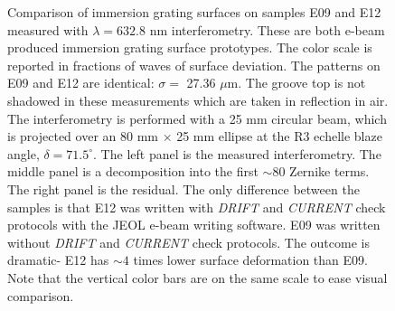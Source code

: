 \begin{figure}
   \newline
  \caption[Interferometry reveals dramatic improvement in performance of e-beam produced immersion gratings]{Comparison of immersion grating surfaces on samples E09 and E12 measured with $\lambda = 632.8 $ nm interferometry.  These are both e-beam produced immersion grating surface prototypes.  The color scale is reported in fractions of waves of surface deviation.  The patterns on E09 and E12 are identical: $\sigma = $ 27.36 $\mu$m.  The groove top is not shadowed in these measurements which are taken in reflection in air.  The interferometry is performed with a 25 mm circular beam, which is projected over an 80 mm $\times$ 25 mm ellipse at the R3 echelle blaze angle, $\delta = 71.5 ^\circ$.  The left panel is the measured interferometry.  The middle panel is a decomposition into the first $\sim 80$ Zernike terms.  The right panel is the residual.  The only difference between the samples is that E12 was written with \emph{DRIFT} and \emph{CURRENT} check protocols with the JEOL e-beam writing software.  E09 was written without \emph{DRIFT} and \emph{CURRENT} check protocols.  The outcome is dramatic- E12 has $\sim 4$ times lower surface deformation than E09.  Note that the vertical color bars are on the same scale to ease visual comparison.}
  \label{fig:igrams}
\end{figure}


